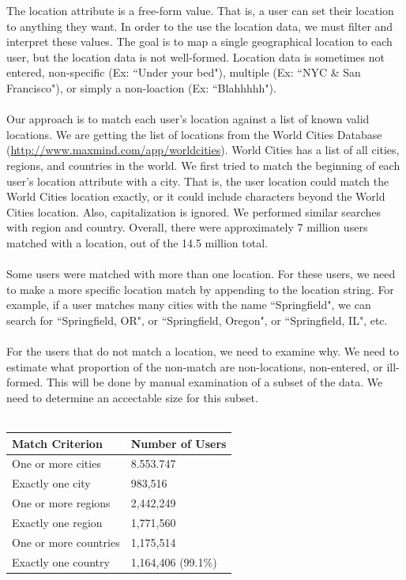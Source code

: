 \noindent The location attribute is a free-form value.  That is, a user can set their location to anything they want.  In order to the use the location data, we must filter and interpret these values.  The goal is to map a single geographical location to each user, but the location data is not well-formed.  Location data is sometimes not entered, non-specific (Ex: ``Under your bed"), multiple (Ex: ``NYC \& San Francisco"), or simply a non-loaction (Ex: ``Blahhhhh").\\\\
Our approach is to match each user's location against a list of known valid locations.  We are getting the list of locations from the World Cities Database (\url{http://www.maxmind.com/app/worldcities}).  World Cities has a list of all cities, regions, and countries in the world.  We first tried to match the beginning of each user's location attribute with a city.  That is, the user location could match the World Cities location exactly, or it could include characters beyond the World Cities location.  Also, capitalization is ignored.  We performed similar searches with region and country.  Overall, there were approximately 7 million users matched with a location, out of the 14.5 million total.\\\\
Some users were matched with more than one location.  For these users, we need to make a more specific location match by appending to the location string.  For example, if a user matches many cities with the name ``Springfield", we can search for ``Springfield, OR", or ``Springfield, Oregon", or ``Springfield, IL", etc.\\\\
For the users that do not match a location, we need to examine why.  We need to estimate what proportion of the non-match are non-locations, non-entered, or ill-formed.  This will be done by manual examination of a subset of the data.  We need to determine an accectable size for this subset.\\\\ 
\begin{tabular}{| l | l |}
\hline
\textbf{Match Criterion} & \textbf{Number of Users} \\ \hline
One or more cities & 8.553.747 \\ \hline
Exactly one city & 983,516 \\ \hline
One or more regions & 2,442,249 \\ \hline
Exactly one region & 1,771,560\\ \hline
One or more countries & 1,175,514 \\ \hline
Exactly one country & 1,164,406 (99.1\%) \\ \hline
\end{tabular}\\\\

